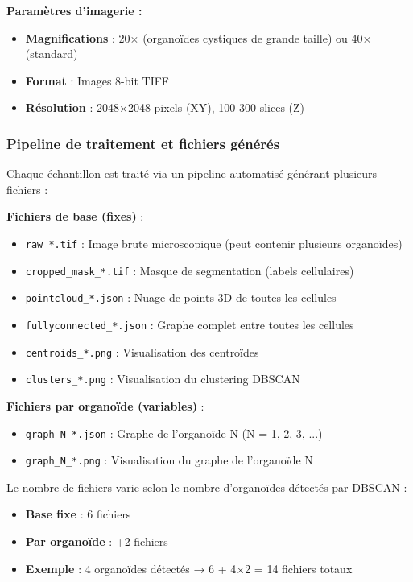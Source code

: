 \textbf{Paramètres d'imagerie :}
\begin{itemize}
    \item \textbf{Magnifications} : 20× (organoïdes cystiques de grande taille) ou 40× (standard)
    \item \textbf{Format} : Images 8-bit TIFF
    \item \textbf{Résolution} : 2048×2048 pixels (XY), 100-300 slices (Z)
\end{itemize}

\subsubsection{Pipeline de traitement et fichiers générés}

Chaque échantillon est traité via un pipeline automatisé générant plusieurs fichiers :

\textbf{Fichiers de base (fixes)} :
\begin{itemize}
    \item \texttt{raw\_*.tif} : Image brute microscopique (peut contenir plusieurs organoïdes)
    \item \texttt{cropped\_mask\_*.tif} : Masque de segmentation (labels cellulaires)
    \item \texttt{pointcloud\_*.json} : Nuage de points 3D de toutes les cellules
    \item \texttt{fullyconnected\_*.json} : Graphe complet entre toutes les cellules
    \item \texttt{centroids\_*.png} : Visualisation des centroïdes
    \item \texttt{clusters\_*.png} : Visualisation du clustering DBSCAN
\end{itemize}

\textbf{Fichiers par organoïde (variables)} :
\begin{itemize}
    \item \texttt{graph\_N\_*.json} : Graphe de l'organoïde N (N = 1, 2, 3, ...)
    \item \texttt{graph\_N\_*.png} : Visualisation du graphe de l'organoïde N
\end{itemize}

Le nombre de fichiers varie selon le nombre d'organoïdes détectés par DBSCAN :
\begin{itemize}
    \item \textbf{Base fixe} : 6 fichiers
    \item \textbf{Par organoïde} : +2 fichiers
    \item \textbf{Exemple} : 4 organoïdes détectés → 6 + 4×2 = 14 fichiers totaux
\end{itemize}

